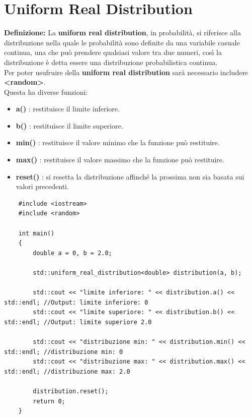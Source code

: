 
\newpage


\section{Uniform Real Distribution}

\textsf{\small \textbf{Definizione: } La \textbf{uniform real distribution}, in probabilità, si riferisce alla distribuzione nella quale le probabilità sono definite da una variabile casuale continua, una che può prendere qualsiasi valore tra due numeri, così la distribuzione è detta essere una distribuzione probabilistica continua. } \\

\textsf{\small Per poter usufruire della \textbf{uniform real distribution} sarà necessario includere \textbf{<random>}.} \\ 

\textsf{\small Questa ha diverse funzioni: } \\

\begin{itemize}
	\item \textsf{\small \textbf{a()} : restituisce il limite inferiore.}
	\item \textsf{\small \textbf{b()} : restituisce il limite superiore.}
	\item \textsf{\small \textbf{min()} : restituisce il valore minimo che la funzione può restituire.}
	\item \textsf{\small \textbf{max()} : restituisce il valore massimo che la funzione può restituire.}
	\item \textsf{\small \textbf{reset()} : si resetta la distribuzione affinché la prossima non sia basata sui valori precedenti.}
\end{itemize}

\begin{lstlisting}
	#include <iostream>
	#include <random>
	
	int main()
	{
		double a = 0, b = 2.0;
		
		std::uniform_real_distribution<double> distribution(a, b);
		
		std::cout << "limite inferiore: " << distribution.a() << std::endl; //Output: limite inferiore: 0
		std::cout << "limite superiore: " << distribution.b() << std::endl; //Output: limite superiore 2.0
		
		std::cout << "distribuzione min: " << distribution.min() << std::endl; //distribuzione min: 0
		std::cout << "distribuzione max: " << distribution.max() << std::endl; //distribuzione max: 2.0
		
		distribution.reset(); 
		return 0;
	}
\end{lstlisting}

